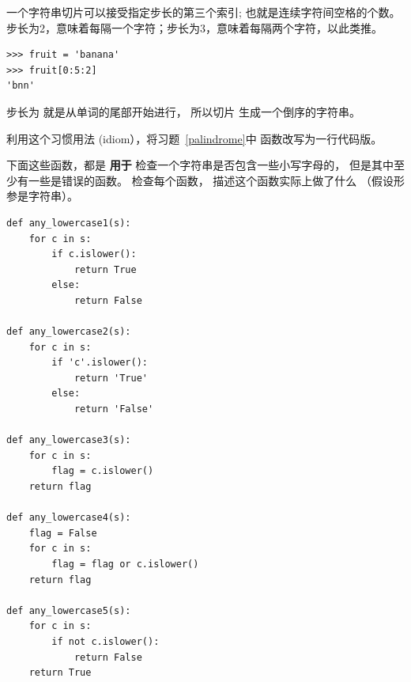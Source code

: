 \begin{exercise}
    


一个字符串切片可以接受指定步长的第三个索引; 也就是连续字符间空格的个数。步长为2，意味着每隔一个字符；步长为3，意味着每隔两个字符，以此类推。

\begin{lstlisting}
>>> fruit = 'banana'
>>> fruit[0:5:2]
'bnn'
\end{lstlisting}


步长为  就是从单词的尾部开始进行， 所以切片 \li{[::-1]} 生成一个倒序的字符串。


利用这个习惯用法 (idiom），将习题~\ref{palindrome}中  函数改写为一行代码版。

\end{exercise}

\begin{exercise}


下面这些函数，都是 {\bf 用于} 检查一个字符串是否包含一些小写字母的， 但是其中至少有一些是错误的函数。 检查每个函数， 描述这个函数实际上做了什么 （假设形参是字符串）。

\begin{lstlisting}
def any_lowercase1(s):
    for c in s:
        if c.islower():
            return True
        else:
            return False

def any_lowercase2(s):
    for c in s:
        if 'c'.islower():
            return 'True'
        else:
            return 'False'

def any_lowercase3(s):
    for c in s:
        flag = c.islower()
    return flag

def any_lowercase4(s):
    flag = False
    for c in s:
        flag = flag or c.islower()
    return flag

def any_lowercase5(s):
    for c in s:
        if not c.islower():
            return False
    return True
\end{lstlisting}

\end{exercise}


